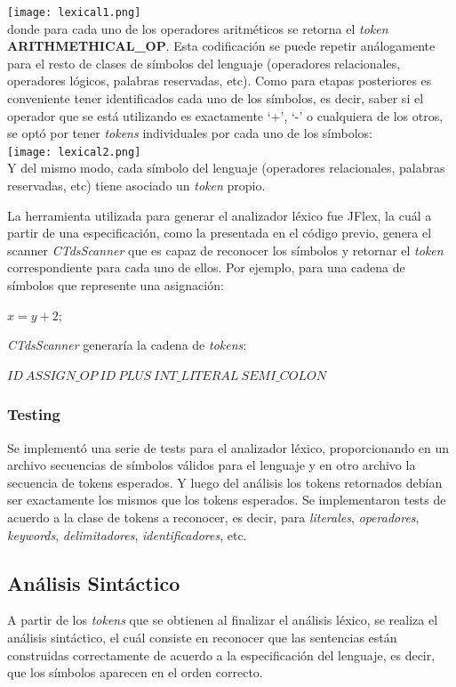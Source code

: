 \documentclass[11pt,a4paper]{article}
\begin{document}
\texttt{[image: lexical1.png]} \\ 
donde para cada uno de los operadores aritméticos se retorna el \textit{token} \textbf{ARITHMETHICAL_OP}. Esta codificación se puede repetir análogamente para el resto de clases de símbolos del lenguaje (operadores relacionales, operadores lógicos, palabras reservadas, etc). Como para etapas posteriores es conveniente tener identificados cada uno de los símbolos, es decir, saber si el operador que se está utilizando es exactamente `+', `-' o cualquiera de los otros, se optó por tener \textit{tokens} individuales por cada uno de los símbolos:
\\

\texttt{[image: lexical2.png]} \\ 

Y del mismo modo, cada símbolo del lenguaje (operadores relacionales, palabras reservadas, etc) tiene asociado un \textit{token} propio.

La herramienta utilizada para generar el analizador léxico fue JFlex, la cuál a partir de una especificación, como la presentada en el código previo, genera el scanner \textit{CTdsScanner} que es capaz de reconocer los símbolos y retornar el \textit{token} correspondiente para cada uno de ellos. Por ejemplo, para una cadena de símbolos que represente una asignación:
\begin{center}
	$x = y+2 ;$
\end{center}
\textit{CTdsScanner} generaría la cadena de \textit{tokens}:
\begin{center}
	$ID \ ASSIGN\_OP \ ID \ PLUS \ INT\_LITERAL \ SEMI\_COLON$
\end{center}

\subsubsection{Testing}

Se implementó una serie de tests para el analizador léxico, proporcionando en un archivo secuencias de símbolos válidos para el lenguaje y en otro archivo la secuencia de tokens esperados. Y luego del análisis los tokens retornados debían ser exactamente los mismos que los tokens esperados. Se implementaron tests de acuerdo a la clase de tokens a reconocer, es decir, para \textit{literales}, \textit{operadores}, \textit{keywords}, \textit{delimitadores}, \textit{identificadores}, etc.

\subsection{Análisis Sintáctico} 
\label{subsec:sintactico}
A partir de los \textit{tokens} que se obtienen al finalizar el análisis léxico, se realiza el análisis sintáctico, el cuál consiste en reconocer que las sentencias están construidas correctamente de acuerdo a la especificación del lenguaje, es decir, que los símbolos aparecen en el orden correcto. 
\end{document}
